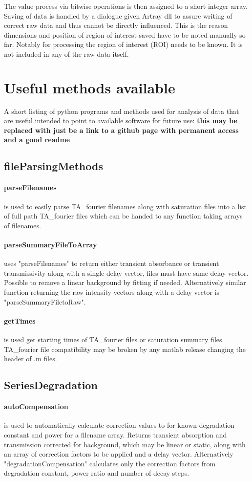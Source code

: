 \documentclass[twoside,openright]{scrreprt}
\begin{document}
The value process via bitwise operations is then assigned to a short integer array. Saving of data is handled by a dialogue given Artray dll to assure writing of correct raw data and thus cannot be directly influenced. This is the reason dimensions and position of region of interest saved have to be noted manually so far. Notably for processing the region of interest (ROI) needs to be known. It is not included in any of the raw data itself.

\section{Useful methods available}
A short listing of python programs and methods used for analysis of data that are useful intended to point to available software for future use: \textbf{this may be replaced with just be a link to a github page with permanent access and a good readme}
\subsection*{fileParsingMethods}
\paragraph{parseFilenames} is used to easily parse TA\_fourier filenames along with saturation files into a list of full path TA\_fourier files which can be handed to any function taking arrays of filenames.
\paragraph{parseSummaryFileToArray} uses "parseFilenames" to return either transient absorbance or transient transmissivity along with a single delay vector, files must have same delay vector. Possible to remove a linear background by fitting if needed. Alternatively similar function returning the raw intensity vectors along with a delay vector is "parseSummaryFiletoRaw".
\paragraph{getTimes} is used get starting times of TA\_fourier files or saturation summary files. TA\_fourier file compatibility may be broken by any matlab release changing the header of .m files.
\subsection*{SeriesDegradation}
\paragraph{autoCompensation} is used to automatically calculate correction values to for known degradation constant and power for a filename array. Returns transient absorption and transmission corrected for background, which may be linear or static, along with an array of correction factors to be applied and a delay vector. Alternatively "degradationCompensation" calculates only the correction factors from degradation constant, power ratio and number of decay steps.
\end{document}
